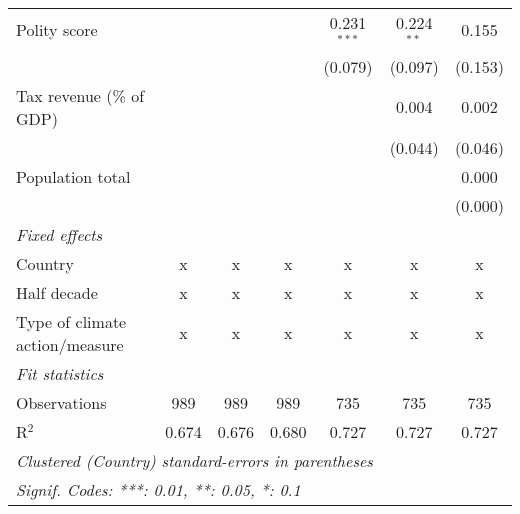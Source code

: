\begin{tabular}{lcccccc}
   Polity score                                                       &         &                &                & 0.231$^{***}$  & 0.224$^{**}$   & 0.155\\   
                                                                      &         &                &                & (0.079)        & (0.097)        & (0.153)\\   
   Tax revenue (\% of GDP)                                            &         &                &                &                & 0.004          & 0.002\\   
                                                                      &         &                &                &                & (0.044)        & (0.046)\\   
   Population total                                                   &         &                &                &                &                & 0.000\\   
                                                                      &         &                &                &                &                & (0.000)\\   
   \emph{Fixed effects}\\
   Country                                                            & x       & x              & x              & x              & x              & x\\  
   Half decade                                                        & x       & x              & x              & x              & x              & x\\  
   Type of climate action/measure                                     & x       & x              & x              & x              & x              & x\\  
   \midrule \emph{Fit statistics}\\
   Observations                                                       & 989     & 989            & 989            & 735            & 735            & 735\\  
   R$^2$                                                              & 0.674   & 0.676          & 0.680          & 0.727          & 0.727          & 0.727\\  
   \midrule
   \multicolumn{7}{l}{\emph{Clustered (Country) standard-errors in parentheses}}\\
   \multicolumn{7}{l}{\emph{Signif. Codes: ***: 0.01, **: 0.05, *: 0.1}}\\
\end{tabular}
\par\endgroup


